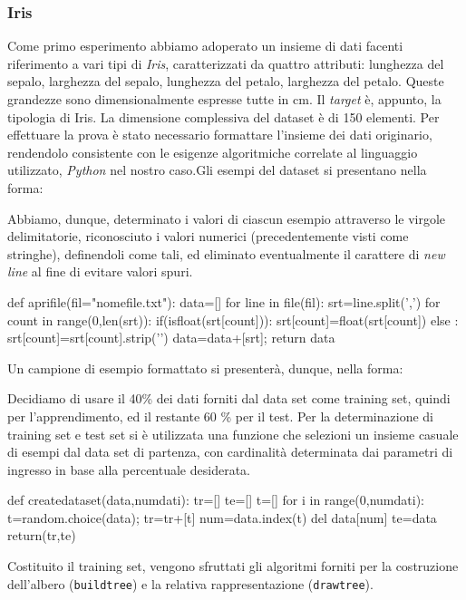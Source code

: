 		\subsubsection{Iris}
			Come primo esperimento abbiamo adoperato un insieme di dati facenti riferimento a vari tipi di \emph{Iris}, caratterizzati da quattro attributi: lunghezza del sepalo, larghezza del sepalo, lunghezza del petalo, larghezza del petalo. Queste grandezze sono dimensionalmente espresse tutte in cm. Il \emph{target} è, appunto, la tipologia di Iris. La dimensione complessiva del dataset è di 150 elementi. Per effettuare la prova è stato necessario formattare l'insieme dei dati originario, rendendolo consistente con le esigenze algoritmiche correlate al linguaggio utilizzato, \emph{Python} nel nostro caso.\newline Gli esempi del dataset si presentano nella forma:
			
			Abbiamo, dunque, determinato i valori di ciascun esempio attraverso le virgole delimitatorie, riconosciuto i valori numerici (precedentemente visti come stringhe), definendoli come tali, ed eliminato eventualmente il carattere di \textit{new line} al fine di evitare valori spuri.
			\medskip
			\begin{python}
		def aprifile(fil="nomefile.txt"):
			data=[]
			for line in file(fil):
				srt=line.split(',')
				for count in range(0,len(srt)):
					if(isfloat(srt[count])):
						srt[count]=float(srt[count])
					else :
						srt[count]=srt[count].strip('\n')
				data=data+[srt];
			return data
			\end{python}
			\bigskip
			Un campione di esempio formattato si presenterà, dunque, nella forma:
			
		
			Decidiamo di usare il 40\% dei dati forniti dal data set come training set, quindi per l'apprendimento, ed il restante 60 \% per il test. Per la determinazione di training set e test set si è utilizzata una funzione che selezioni un insieme casuale di esempi dal data set di partenza, con cardinalità determinata dai parametri di ingresso in base alla percentuale desiderata.
			\bigskip
			\begin{python}
		def createdataset(data,numdati):
			tr=[]
			te=[]
			t=[]
			for i in range(0,numdati):
				t=random.choice(data);
				tr=tr+[t]
				num=data.index(t)
				del data[num]
			te=data
			return(tr,te)
			\end{python}
			\bigskip
			Costituito il training set, vengono sfruttati gli algoritmi forniti per la costruzione dell'albero (\texttt{buildtree}) e la relativa rappresentazione (\texttt{drawtree}).
		
